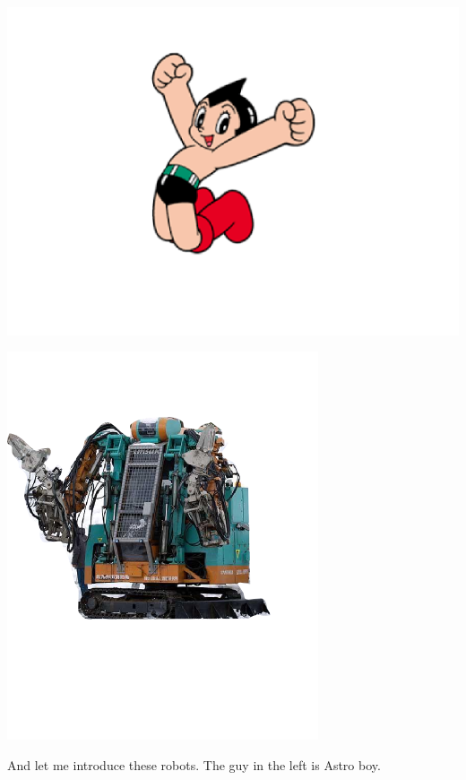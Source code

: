 \begin{container-fluid}
\begin{row-fluid}
\begin{span6}
\includegraphics{img/astro/1.png}
\end{span6}
\begin{span6}
\includegraphics{img/rescue/1.png}
\end{span6}
\end{row-fluid}
\end{container-fluid}

\begin{resume}
And let me introduce these robots.
The guy in the left is Astro boy.
\end{resume}

